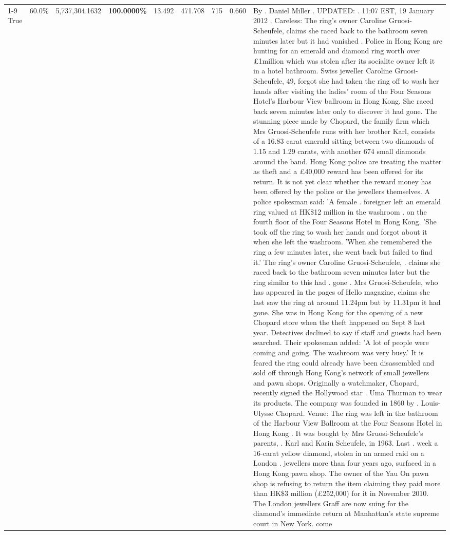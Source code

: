 \begin{table}[H]
\begin{tabular}{lllrlllll}
\cline{1-9}
True & 60.0\% & 5,737,304.1632 & \bfseries \color{red} 100.0000\% & 13.492 & 471.708 & 715 & 0.660 & By . Daniel Miller . UPDATED: . 11:07 EST, 19 January 2012 . Careless: The ring's owner Caroline Gruosi-Scheufele, claims she raced back to the bathroom seven minutes later but it had vanished . Police in Hong Kong are hunting for an emerald and diamond ring worth over £1million which was stolen after its socialite owner left it in a hotel bathroom. Swiss jeweller Caroline Gruosi-Scheufele, 49, forgot she had taken the ring off to wash her hands after visiting the ladies' room of the Four Seasons Hotel's Harbour View ballroom in Hong Kong. She raced back seven minutes later only to discover it had gone. The stunning piece made by Chopard, the family firm which Mrs Gruosi-Scheufele runs with her brother Karl, consists of a 16.83 carat emerald sitting between two diamonds of 1.15 and 1.29 carats, with another 674 small diamonds around the band. Hong Kong police are treating the matter as theft and a £40,000 reward has been offered for its return. It is not yet clear whether the reward money has been offered by the police or the jewellers themselves. A police spokesman said: 'A female . foreigner left an emerald ring valued at HK\$12 million in the washroom . on the fourth floor of the Four Seasons Hotel in Hong Kong. 'She took off the ring to wash her hands and forgot about it when she left the washroom. 'When she remembered the ring a few minutes later, she went back but failed to find it.' The ring's owner Caroline Gruosi-Scheufele, . claims she raced back to the bathroom seven minutes later but the ring similar to this had . gone . Mrs Gruosi-Scheufele, who has appeared in the pages of Hello magazine, claims she last saw the ring at around 11.24pm but by 11.31pm it had gone. She was in Hong Kong for the opening of a new Chopard store when the theft happened on Sept 8 last year. Detectives declined to say if staff and guests had been searched. Their spokesman added: 'A lot of people were coming and going. The washroom was very busy.' It is feared the ring could already have been disassembled and sold off through Hong Kong's network of small jewellers and pawn shops. Originally a watchmaker, Chopard, recently signed the Hollywood star . Uma Thurman to wear its products. The company was founded in 1860 by . Louis-Ulysse Chopard. Venue: The ring was left in the bathroom of the Harbour View Ballroom at the Four Seasons Hotel in Hong Kong . It was bought by Mrs Gruosi-Scheufele's  parents, . Karl and Karin Scheufele, in 1963. Last . week a 16-carat yellow diamond, stolen in an armed raid on a London . jewellers more than four years ago, surfaced in a Hong Kong pawn shop. The owner of the Yau On pawn shop is refusing to return the item claiming they paid more than HK\$3 million (£252,000) for it in November 2010. The London jewellers Graff are now suing for the diamond’s immediate return at Manhattan’s state supreme court in New York. come \\

\end{tabular}
\end{table}
